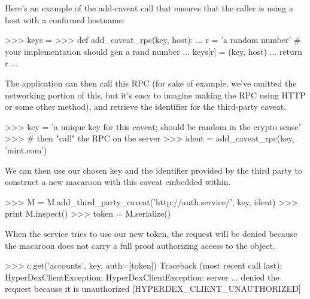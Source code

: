 Here's an example of the add-caveat call that ensures that the caller is using a
host with a confirmed hostname:

\begin{pythoncode}
>>> keys = {}
>>> def add_caveat_rpc(key, host):
...     r = 'a random number' # your implementation should gen a rand number
...     keys[r] = (key, host)
...     return r
...
\end{pythoncode}

The application can then call this RPC (for sake of example, we've omitted the
networking portion of this, but it's easy to imagine making the RPC using HTTP
or some other method), and retrieve the identifier for the third-party caveat.

\begin{pythoncode}
>>> key = 'a unique key for this caveat; should be random in the crypto sense'
>>> # then "call" the RPC on the server
>>> ident = add_caveat_rpc(key, 'mint.com')
\end{pythoncode}

We can then use our chosen key and the identifier provided by the third party to
construct a new macaroon with this caveat embedded within.

\begin{pythoncode}
>>> M = M.add_third_party_caveat('http://auth.service/', key, ident)
>>> print M.inspect()
>>> token = M.serialize()
\end{pythoncode}

When the service tries to use our new token, the request will be denied because
the macaroon does not carry a full proof authorizing access to the object.

\begin{pythoncode}
>>> c.get('accounts', key, auth=[token])
Traceback (most recent call last):
HyperDexClientException: HyperDexClientException: server ... denied the request because it is unauthorized [HYPERDEX_CLIENT_UNAUTHORIZED]
\end{pythoncode}


